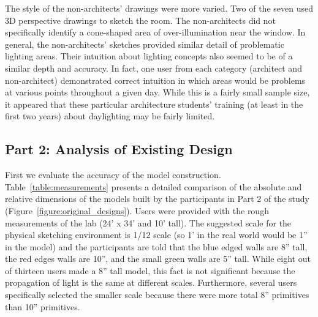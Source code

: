 \documentclass[review]{vgtc}                 %
\begin{document}
The style of the non-architects' drawings were more varied. Two of the
seven used 3D perspective drawings to sketch the room.  The
non-architects did not specifically identify a cone-shaped area of
over-illumination near the window.  In general, the non-architects'
sketches provided similar detail of problematic lighting areas.  Their
intuition about lighting concepts also seemed to be of a similar depth
and accuracy.  In fact, one user from each category (architect and
non-architect) demonstrated correct intuition in which areas would be
problems at various points throughout a given day.  While this is a
fairly small sample size, it appeared that these particular
architecture students' training (at least in the first two years)
about daylighting may be fairly limited.





\subsection{Part 2: Analysis of Existing Design}

First we evaluate the accuracy of the model construction.
Table~\ref{table:measurements} presents a detailed comparison of the
absolute and relative dimensions of the models built by the
participants in Part 2 of the study
(Figure~\ref{figure:original_designs}).  
%
Users were provided with the rough measurements of the lab (24' x 34'
and 10' tall).  The suggested scale for the physical sketching
environment is 1/12 scale (so 1' in the real world would be 1'' in the
model) and the participants are told that the blue edged walls are 8''
tall, the red edges walls are 10'', and the small green walls are 5''
tall.
%
While eight out of thirteen users made a 8'' tall model, this fact is
not significant because the propagation of light is the same at
different scales.  Furthermore, several users specifically selected
the smaller scale because there were more total 8'' primitives than
10'' primitives.
%
\end{document}
